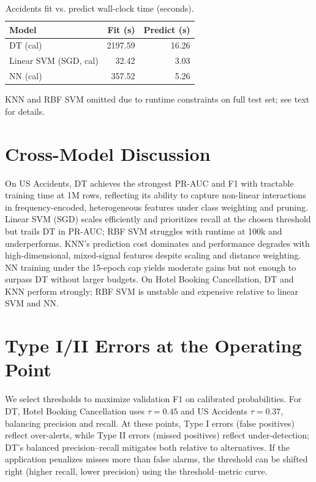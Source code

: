 \documentclass[conference]{IEEEtran}
\newcommand{\datasetA}{Hotel Booking Cancellation}
\newcommand{\datasetB}{US Accidents}
\begin{document}

\begin{table}[htbp]
\caption{Accidents fit vs. predict wall-clock time (seconds).}
\begin{center}
\begin{tabular}{|l|r|r|}
\hline
Model & Fit (s) & Predict (s) \\
\hline
DT (cal) & 2197.59 & 16.26 \\
 Linear SVM (SGD, cal) & 32.42 & 3.03 \\
 NN (cal) & 357.52 & 5.26 \\
\hline
\end{tabular}
\end{center}
\vspace{2pt}\footnotesize KNN and RBF SVM omitted due to runtime constraints on full test set; see text for details.
\end{table}

\section{Cross-Model Discussion}
On \datasetB{}, DT achieves the strongest PR-AUC and F1 with tractable training time at 1M rows, reflecting its ability to capture non-linear interactions in frequency-encoded, heterogeneous features under class weighting and pruning. Linear SVM (SGD) scales efficiently and prioritizes recall at the chosen threshold but trails DT in PR-AUC; RBF SVM struggles with runtime at 100k and underperforms. KNN's prediction cost dominates and performance degrades with high-dimensional, mixed-signal features despite scaling and distance weighting. NN training under the 15-epoch cap yields moderate gains but not enough to surpass DT without larger budgets. On \datasetA{}, DT and KNN perform strongly; RBF SVM is unstable and expensive relative to linear SVM and NN.

\section{Type I/II Errors at the Operating Point}
We select thresholds to maximize validation F1 on calibrated probabilities. For DT, \datasetA{} uses $\tau\!=\!0.45$ and \datasetB{} $\tau\!=\!0.37$, balancing precision and recall. At these points, Type I errors (false positives) reflect over-alerts, while Type II errors (missed positives) reflect under-detection; DT's balanced precision–recall mitigates both relative to alternatives. If the application penalizes misses more than false alarms, the threshold can be shifted right (higher recall, lower precision) using the threshold–metric curve.
\end{document}
